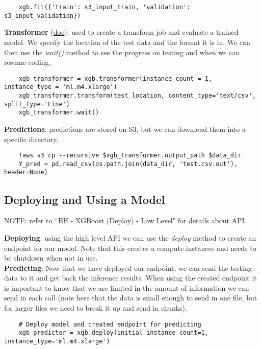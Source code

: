 \documentclass[11pt, a4paper]{article}
\begin{document}
\begin{spacing}{1.1}
\begin{lstlisting}
	xgb.fit({'train': s3_input_train, 'validation': s3_input_validation})
	\end{lstlisting} \vspace*{2mm}
	\textbf{Transformer} (\href{https://sagemaker.readthedocs.io/en/latest/transformer.html}{doc}): used to create a transform job and evaluate a trained model. We specify the location of the test data and the format it is in. We can then use the \textit{wait()} method to see the progress on testing and when we can resume coding. 
	\begin{lstlisting}
	xgb_transformer = xgb.transformer(instance_count = 1, instance_type = 'ml.m4.xlarge')
	xgb_transformer.transform(test_location, content_type='text/csv', split_type='Line')
	xgb_transformer.wait()
	\end{lstlisting}\vspace*{2mm}
	\textbf{Predictions}: predictions are stored on S3, but we can download them into a specific directory.
	\begin{lstlisting}
	!aws s3 cp --recursive $xgb_transformer.output_path $data_dir
	Y_pred = pd.read_csv(os.path.join(data_dir, 'test.csv.out'), header=None)
	\end{lstlisting} \newpage
	
	\subsection{Deploying and Using a Model}
	\begin{center}
	\color{darkgray} NOTE: refer to ``BH - XGBoost (Deploy) - Low Level" for details about API. \color{black}
	\end{center}
	\textbf{Deploying}: using the high level API we can use the \textit{deploy} method to create an endpoint for our model. Note that this creates a compute instances and needs to be shutdown when not in use. \vspace*{2mm}\\
	\textbf{Predicting}: Now that we have deployed our endpoint, we can send the testing data to it and get back the inference results. When using the created endpoint it is important to know that we are limited in the amount of information we can send in each call (note here that the data is small enough to send in one file, but for larger files we need to break it up and send in chunks).
	\begin{lstlisting}
	# Deploy model and created endpoint for predicting
	xgb_predictor = xgb.deploy(initial_instance_count=1, instance_type='ml.m4.xlarge')
	

\end{lstlisting}
\end{spacing}
\end{document}

